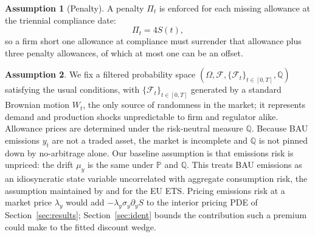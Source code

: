 \documentclass[11pt,letterpaper]{article}
\theoremstyle{plain}
\theoremstyle{definition}
\newtheorem{assumption}{Assumption}
\newcommand{\Prob}{\mathbb{P}}               %
\newcommand{\Qmeasure}{\mathbb{Q}}           %
\newcommand{\Filt}{\mathcal{F}}              %
\numberwithin{equation}{section}
\begin{document}
\begin{assumption}[Penalty]\label{ass:pen}
A penalty $\Pi_t$ is enforced for each missing allowance at the triennial compliance date:
\begin{equation}
\Pi_t=4S(t),
\end{equation}
so a firm short one allowance at compliance must surrender that allowance plus three penalty allowances, of which at most one can be an offset.
\end{assumption}

\begin{assumption}\label{ass:prob}
We fix a filtered probability space $(\Omega,\Filt,\{\Filt_t\}_{t\in[0,T]},\Qmeasure)$ satisfying the usual conditions, with $\{\Filt_t\}_{t\in[0,T]}$ generated by a standard Brownian motion $W_t$, the only source of randomness in the market; it represents demand and production shocks unpredictable to firm and regulator alike. Allowance prices are determined under the risk-neutral measure $\Qmeasure$. Because BAU emissions $y_t$ are not a traded asset, the market is incomplete and $\Qmeasure$ is not pinned down by no-arbitrage alone. Our baseline assumption is that emissions risk is unpriced: the drift $\mu_y$ is the same under $\Prob$ and $\Qmeasure$. This treats BAU emissions as an idiosyncratic state variable uncorrelated with aggregate consumption risk, the assumption maintained by \citet{carmona2011} and \citet{hitzemann2018} for the EU ETS. Pricing emissions risk at a market price $\lambda_y$ would add $-\lambda_y\sigma_y\partial_yS$ to the interior pricing PDE of Section~\ref{sec:results}; Section~\ref{sec:ident} bounds the contribution such a premium could make to the fitted discount wedge.
\end{assumption}
\end{document}

